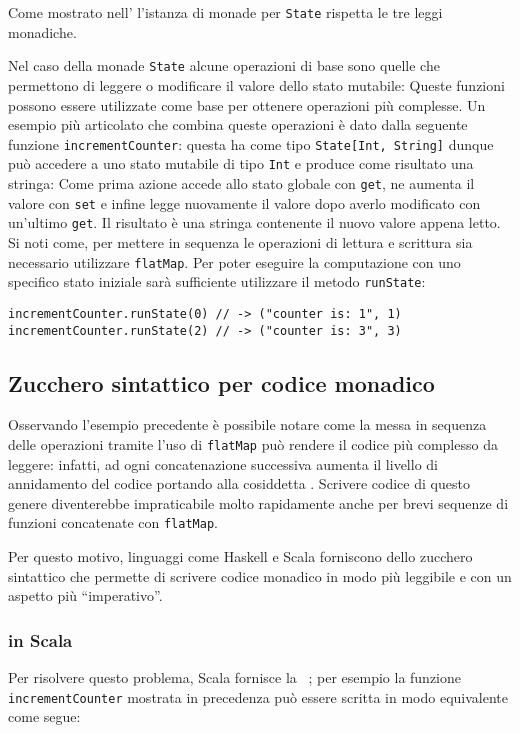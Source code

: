 Come mostrato nell' l'istanza di monade per \lstinline{State} rispetta le tre leggi monadiche.

Nel caso della monade \lstinline{State} alcune operazioni di base sono quelle che permettono di leggere o modificare il valore dello stato mutabile:
Queste funzioni possono essere utilizzate come base per ottenere operazioni più complesse. Un esempio più articolato che combina queste operazioni è dato dalla seguente funzione \lstinline{incrementCounter}: questa ha come tipo \lstinline{State[Int, String]} dunque può accedere a uno stato mutabile di tipo \lstinline{Int} e produce come risultato una stringa:
Come prima azione accede allo stato globale con \lstinline{get}, ne aumenta il valore con \lstinline{set} e infine legge nuovamente il valore dopo averlo modificato con un'ultimo \lstinline{get}. Il risultato è una stringa contenente il nuovo valore appena letto.
Si noti come, per mettere in sequenza le operazioni di lettura e scrittura sia necessario utilizzare \lstinline{flatMap}. Per poter eseguire la computazione con uno specifico stato iniziale sarà sufficiente utilizzare il metodo \lstinline{runState}:
\begin{lstlisting}[language=scala3]
incrementCounter.runState(0) // -> ("counter is: 1", 1)
incrementCounter.runState(2) // -> ("counter is: 3", 3)
\end{lstlisting}

\subsection{Zucchero sintattico per codice monadico}
Osservando l'esempio precedente è possibile notare come la messa in sequenza delle operazioni tramite l'uso di \lstinline{flatMap} può rendere il codice più complesso da leggere: infatti, ad ogni concatenazione successiva aumenta il livello di annidamento del codice portando alla cosiddetta .
Scrivere codice di questo genere diventerebbe impraticabile molto rapidamente anche per brevi sequenze di funzioni concatenate con \lstinline{flatMap}.

Per questo motivo, linguaggi come Haskell e Scala forniscono dello zucchero sintattico che permette di scrivere codice monadico in modo più leggibile e con un aspetto più ``imperativo''.

\subsubsection{ in Scala}
\label{sec:for-comprehension-in-scala}
Per risolvere questo problema, Scala fornisce la ~\cite{cit:scala-book-control-structures}; per esempio la funzione \lstinline{incrementCounter} mostrata in precedenza può essere scritta in modo equivalente come segue:

